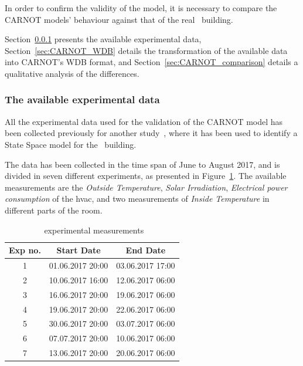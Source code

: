 In order to confirm the validity of the model, it is necessary to compare the
CARNOT models' behaviour against that of the real \pdome\ building.

Section~\ref{sec:CARNOT_expdata} presents the available experimental data,
Section~\ref{sec:CARNOT_WDB} details the transformation of the available data
into CARNOT's WDB format, and Section~\ref{sec:CARNOT_comparison} details a
qualitative analysis of the differences.

\subsubsection{The available experimental data}\label{sec:CARNOT_expdata}

All the experimental data used for the validation of the CARNOT model has been
collected previously for another
study~\cite{fabiettiMultitimeScaleCoordination2018}, where it has been used to
identify a State Space model for the \pdome\ building.

The data has been collected in the time span of June to August 2017, and is
divided in seven different experiments, as presented in
Figure~\ref{tab:exp_dates}. The available measurements are the \textit{Outside
Temperature}, \textit{Solar Irradiation}, \textit{Electrical power consumption}
of the \acrshort{hvac}, and two measurements of \textit{Inside Temperature} in
different parts of the room.

\begin{table}[ht]
\centering
    \begin{tabular}{||c c c||}
        \hline
        Exp no. & Start Date & End Date\\
        \hline \hline
        1 & 01.06.2017 20:00 & 03.06.2017 17:00 \\
        2 & 10.06.2017 16:00 & 12.06.2017 06:00 \\
        3 & 16.06.2017 20:00 & 19.06.2017 06:00 \\
        4 & 19.06.2017 20:00 & 22.06.2017 06:00 \\
        5 & 30.06.2017 20:00 & 03.07.2017 06:00 \\
        6 & 07.07.2017 20:00 & 10.06.2017 06:00 \\
        7 & 13.06.2017 20:00 & 20.06.2017 06:00 \\
        \hline
    \end{tabular}
\caption{\pdome\ experimental measurements}
\label{tab:exp_dates}
\end{table}

